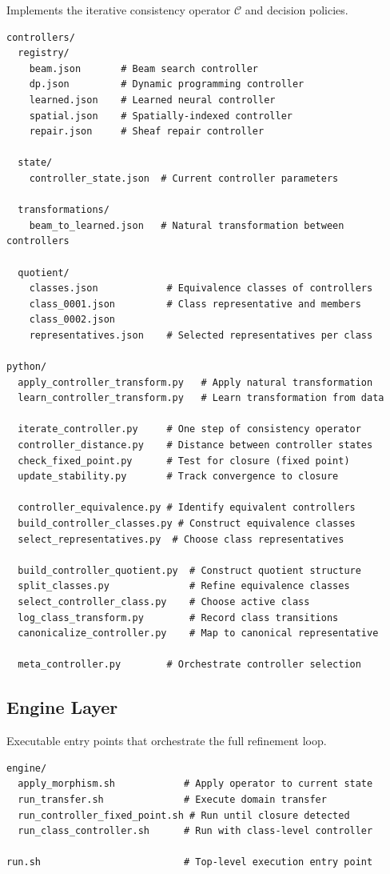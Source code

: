 \documentclass[11pt, oneside]{article}
\begin{document}
Implements the iterative consistency operator $\mathcal{C}$ and decision policies.
\begin{verbatim}
controllers/
  registry/
    beam.json       # Beam search controller
    dp.json         # Dynamic programming controller
    learned.json    # Learned neural controller
    spatial.json    # Spatially-indexed controller
    repair.json     # Sheaf repair controller

  state/
    controller_state.json  # Current controller parameters

  transformations/
    beam_to_learned.json   # Natural transformation between controllers

  quotient/
    classes.json            # Equivalence classes of controllers
    class_0001.json         # Class representative and members
    class_0002.json
    representatives.json    # Selected representatives per class

python/
  apply_controller_transform.py   # Apply natural transformation
  learn_controller_transform.py   # Learn transformation from data

  iterate_controller.py     # One step of consistency operator
  controller_distance.py    # Distance between controller states
  check_fixed_point.py      # Test for closure (fixed point)
  update_stability.py       # Track convergence to closure

  controller_equivalence.py # Identify equivalent controllers
  build_controller_classes.py # Construct equivalence classes
  select_representatives.py  # Choose class representatives

  build_controller_quotient.py  # Construct quotient structure
  split_classes.py              # Refine equivalence classes
  select_controller_class.py    # Choose active class
  log_class_transform.py        # Record class transitions
  canonicalize_controller.py    # Map to canonical representative

  meta_controller.py        # Orchestrate controller selection
\end{verbatim}

\subsection{Engine Layer}

Executable entry points that orchestrate the full refinement loop.
\begin{verbatim}
engine/
  apply_morphism.sh            # Apply operator to current state
  run_transfer.sh              # Execute domain transfer
  run_controller_fixed_point.sh # Run until closure detected
  run_class_controller.sh      # Run with class-level controller

run.sh                         # Top-level execution entry point
\end{verbatim}
\end{document}
